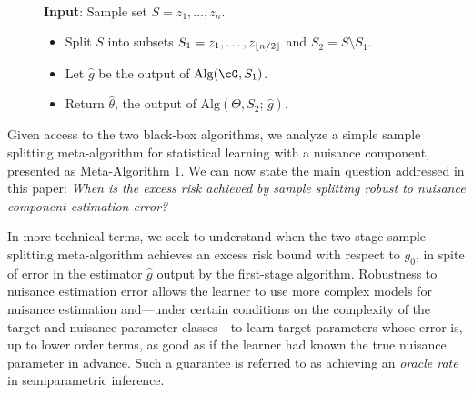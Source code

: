 \documentclass[11pt]{article} %
\newcommand{\savehyperref}[2]{\texorpdfstring{\hyperref[#1]{#2}}{#2}}
\theoremstyle{theorem}  %
\theoremstyle{plain}
\DeclarePairedDelimiter{\floor}{\lfloor}{\rfloor}
\newcommand{\wh}[1]{\widehat{#1}}
\newcommand{\midsem}{;\,}
\newcommand{\estone}{\wh{g}}
\newcommand{\esttwo}{\wh{\theta}}
\newcommand{\nuisance}{\cG}
\newcommand{\target}{\Theta}
\newcommand{\gtone}{g_0}
\newcommand{\sampleone}{S_1}
\newcommand{\sampletwo}{S_2}
\newcommand{\param}{parameter\xspace}
\newcommand{\params}{parameters\xspace}
\begin{document}
%



\begin{figure}[tp]
\begin{framedmetaalgorithm}~\\
\textbf{Input}: Sample set $S=z_1,\ldots,z_n$.
\begin{itemize}
\item Split $S$ into subsets $\sampleone=z_1,\ldots,z_{\floor{n/2}}$ and $\sampletwo=S\setminus{}\sampleone$.
\item Let $\estone$ be the output of $\mathrm{Alg}(\nuisance,\sampleone)$.
\item Return $\esttwo$, the output of $\mathrm{Alg}(\target,\sampletwo\midsem\estone)$.
\end{itemize}
\label{alg:sample_splitting}
\end{framedmetaalgorithm}
\end{figure}
Given access to the two black-box algorithms, we analyze a simple sample splitting meta-algorithm for statistical learning with a nuisance component, presented as \savehyperref{alg:sample_splitting}{Meta-Algorithm \ref{alg:sample_splitting}}.
We can now state the main question addressed in this paper: 
\emph{When is the excess risk achieved by sample splitting robust to nuisance component estimation error?}

In more technical terms, we seek to understand when the two-stage sample splitting meta-algorithm achieves an excess risk bound with respect to $\gtone$, in spite of error in the estimator $\estone$ output by the first-stage algorithm. Robustness to nuisance estimation error allows the learner to use more complex models for nuisance estimation and---under certain conditions on the complexity of the target and nuisance \param classes---to learn target \params whose error is, up to lower order terms, as good as if the learner had known the true nuisance \param in advance. Such a guarantee is referred to as achieving an \emph{oracle rate} in semiparametric inference.

%
\end{document}
